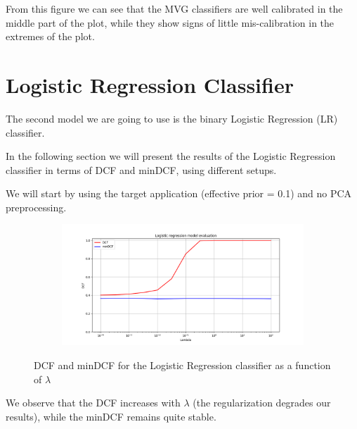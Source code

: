 \documentclass[12pt]{report}
\newcommand{\nnl}{%
    \newline
    \newline
}
\begin{document}
\noindent
From this figure we can see that the MVG classifiers are well calibrated in the middle part of the plot, while they show signs of little mis-calibration in the extremes of the plot.

\section{Logistic Regression Classifier}
The second model we are going to use is the binary Logistic Regression (LR) classifier.
\nnl
In the following section we will present the results of the Logistic Regression classifier in terms of DCF and minDCF, using different setups.
\nnl
We will start by using the target application (effective prior = 0.1) and no PCA preprocessing.
\begin{figure}[H]
    \centering
    \begin{subfigure}[t]{0.6\textwidth}
        \includegraphics[width=\textwidth]{./plot/LR/log_reg.png}
    \end{subfigure}
    \caption{DCF and minDCF for the Logistic Regression classifier as a function of $\lambda$}
    \label{fig:log_reg}
\end{figure}
\noindent
We observe that the DCF increases with $\lambda$ (the regularization degrades our results), while the minDCF remains quite stable.
\end{document}
